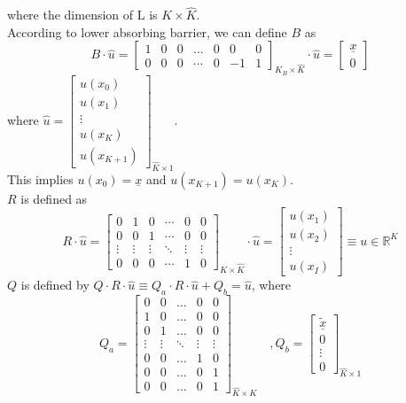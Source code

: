 \documentclass[11pt]{article}
\newcommand{\R}{\ensuremath{\mathbb{R}}}
\begin{document}
where the dimension of L is $K\times\hat{K}$.\\
According to lower absorbing barrier, we can define $B$ as
\begin{equation}
B\cdot\hat{u} =\begin{bmatrix}
1&0&0&\dots&0&0&0\\
0&0&0&\cdots&0&-1&1
\end{bmatrix}_{K_B\times \hat{K}}\cdot\hat{u} = \begin{bmatrix}
\underline{\textit{\~{x}}}\\
0
\end{bmatrix}
\end{equation}
where $\hat{u} = \begin{bmatrix}
u(x_0)\\
u(x_1)\\
\vdots\\
u(x_K)\\
u(x_{K+1})
\end{bmatrix}_{\hat{K}\times 1}$.\\
This implies $u(x_0) = \underline{\textit{\~{x}}}$ and $u(x_{K+1}) = u(x_K)$.\\
$R$ is defined as 
\begin{equation}
R\cdot \hat{u} =\begin{bmatrix}
0&1&0&\cdots&0&0\\
0&0&1&\cdots&0&0\\
\vdots&\vdots&\vdots&\ddots&\vdots&\vdots\\
0&0&0&\cdots&1&0
\end{bmatrix}_{K\times\hat{K}}\cdot \hat{u}		 
=\begin{bmatrix}
u(x_1)\\
u(x_2)\\
\vdots\\
u(x_I)
\end{bmatrix} \equiv u\in \R^{K} 
\end{equation}
$Q$ is defined by $Q\cdot R\cdot\hat{u}\equiv Q_a\cdot R\cdot\hat{u}+Q_b = \hat{u}$, where 
\begin{equation}
Q_a = \begin{bmatrix}
0& 0&\dots&0&0\\
1&0&\dots&0&0\\
0&1&\dots&0&0\\
\vdots&\vdots&\ddots&\vdots&\vdots\\
0&0&\dots&1&0\\
0&0&\dots&0&1\\
0&0&\dots&0&1
\end{bmatrix}_{\hat{K}\times K}\quad , Q_b = \begin{bmatrix}
\underline{\tilde{x}}\\
0\\
\vdots\\
0
\end{bmatrix}_{\hat{K}\times 1}
\end{equation}
\end{document}
